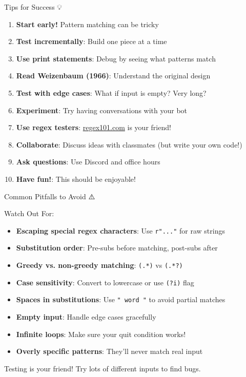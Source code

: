 \documentclass[aspectratio=169]{beamer}
\begin{document}
\begin{frame}[shrink=10]{Tips for Success 💡}
\begin{enumerate}\setlength{\itemsep}{0pt}
    \item \textbf{Start early!} Pattern matching can be tricky
    \item \textbf{Test incrementally}: Build one piece at a time
    \item \textbf{Use print statements}: Debug by seeing what patterns match
    \item \textbf{Read Weizenbaum (1966)}: Understand the original design
    \item \textbf{Test with edge cases}: What if input is empty? Very long?
    \item \textbf{Experiment}: Try having conversations with your bot
    \item \textbf{Use regex testers}: \href{https://regex101.com}{regex101.com} is your friend!
    \item \textbf{Collaborate}: Discuss ideas with classmates (but write your own code!)
    \item \textbf{Ask questions}: Use Discord and office hours
    \item \textbf{Have fun!}: This should be enjoyable!
\end{enumerate}
\end{frame}

\begin{frame}{Common Pitfalls to Avoid ⚠️}
\small
\begin{alertblock}{Watch Out For:}
\begin{itemize}\setlength{\itemsep}{0pt}
    \item \textbf{Escaping special regex characters}: Use \texttt{r"..."} for raw strings
    \item \textbf{Substitution order}: Pre-subs before matching, post-subs after
    \item \textbf{Greedy vs. non-greedy matching}: \texttt{(.*)} vs \texttt{(.*?)}
    \item \textbf{Case sensitivity}: Convert to lowercase or use \texttt{(?i)} flag
    \item \textbf{Spaces in substitutions}: Use \texttt{" word "} to avoid partial matches
    \item \textbf{Empty input}: Handle edge cases gracefully
    \item \textbf{Infinite loops}: Make sure your quit condition works!
    \item \textbf{Overly specific patterns}: They'll never match real input
\end{itemize}
\end{alertblock}

\vspace{0.3cm}

\begin{thinkaboutit}
Testing is your friend! Try lots of different inputs to find bugs.
\end{thinkaboutit}
\end{frame}
\end{document}
